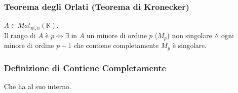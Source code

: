 \documentclass[a4paper, twoside, italian, 11pt]{book}
\newcommand{\K}{\mathbb{K}}
\begin{document}
\subsubsection{Teorema degli Orlati (Teorema di Kronecker)}

$A \in Mat_{m,n}(\K)$.\\
Il rango di $A$ è $p \iff \exists$ in $A$ un minore di ordine $p$ ($M_p$) non singolare $\land$ ogni minore di ordine $p + 1$ che contiene completamente $M_p$ è singolare.

\subsubsection{Definizione di Contiene Completamente}
Che ha al suo interno.
\end{document}

